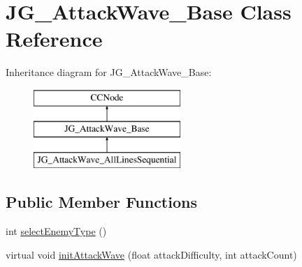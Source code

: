 \hypertarget{class_j_g___attack_wave___base}{\section{J\-G\-\_\-\-Attack\-Wave\-\_\-\-Base Class Reference}
\label{class_j_g___attack_wave___base}
}
Inheritance diagram for J\-G\-\_\-\-Attack\-Wave\-\_\-\-Base\-:\begin{figure}[H]
\begin{center}
\leavevmode
\includegraphics[height=3.000000cm]{class_j_g___attack_wave___base}
\end{center}
\end{figure}
\subsection*{Public Member Functions}
\begin{DoxyCompactItemize}
\item 
int \hyperlink{class_j_g___attack_wave___base_a25af9b766665b528f921daa05f3088f4}{select\-Enemy\-Type} ()
\item 
virtual void \hyperlink{class_j_g___attack_wave___base_a5b4110b0837bd6637902c739322a3554}{init\-Attack\-Wave} (float attack\-Difficulty, int attack\-Count)
\end{DoxyCompactItemize}
